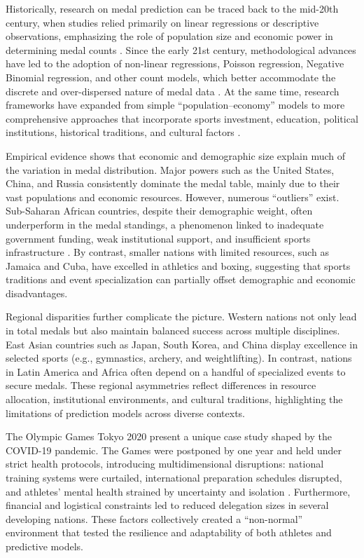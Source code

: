 \documentclass[11pt,twoside]{article}
\numberwithin{Theorem}{section}
\numberwithin{Definition}{section}
\numberwithin{Lemma}{section}
\numberwithin{Algorithm}{section}
\numberwithin{equation}{section}
\begin{document}
Historically, research on medal prediction can be traced back to the mid-20th century, when studies relied primarily on linear regressions or descriptive observations, emphasizing the role of population size and economic power in determining medal counts \cite{johnson2004}. Since the early 21st century, methodological advances have led to the adoption of non-linear regressions, Poisson regression, Negative Binomial regression, and other count models, which better accommodate the discrete and over-dispersed nature of medal data \cite{scelles2020}. At the same time, research frameworks have expanded from simple “population–economy” models to more comprehensive approaches that incorporate sports investment, education, political institutions, historical traditions, and cultural factors \cite{forrest2010}.

Empirical evidence shows that economic and demographic size explain much of the variation in medal distribution. Major powers such as the United States, China, and Russia consistently dominate the medal table, mainly due to their vast populations and economic resources. However, numerous “outliers” exist. Sub-Saharan African countries, despite their demographic weight, often underperform in the medal standings, a phenomenon linked to inadequate government funding, weak institutional support, and insufficient sports infrastructure \cite{amusa2003}. By contrast, smaller nations with limited resources, such as Jamaica and Cuba, have excelled in athletics and boxing, suggesting that sports traditions and event specialization can partially offset demographic and economic disadvantages.

Regional disparities further complicate the picture. Western nations not only lead in total medals but also maintain balanced success across multiple disciplines. East Asian countries such as Japan, South Korea, and China display excellence in selected sports (e.g., gymnastics, archery, and weightlifting). In contrast, nations in Latin America and Africa often depend on a handful of specialized events to secure medals. These regional asymmetries reflect differences in resource allocation, institutional environments, and cultural traditions, highlighting the limitations of prediction models across diverse contexts.

The Olympic Games Tokyo 2020 present a unique case study shaped by the COVID-19 pandemic. The Games were postponed by one year and held under strict health protocols, introducing multidimensional disruptions: national training systems were curtailed, international preparation schedules disrupted, and athletes’ mental health strained by uncertainty and isolation \cite{preuss2021}. Furthermore, financial and logistical constraints led to reduced delegation sizes in several developing nations. These factors collectively created a “non-normal” environment that tested the resilience and adaptability of both athletes and predictive models.
\end{document}

